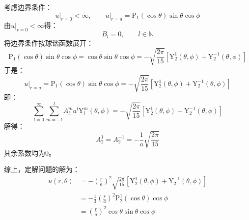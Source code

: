 \documentclass[fontset=windows]{ctexart}
\begin{document}
\begin{itemize}
\[    \]
    考虑边界条件：
    \[
    \left.u\right|_{r=0} < \infty,\qquad \left.u\right|_{r=a} = \mathrm{P}_1(\cos\theta)\sin\theta\cos\phi
    \]
    由$\left.u\right|_{r=0} < \infty$得：
    \[
    B_l = 0,\qquad l\in\mathbb{N}
    \]
    将边界条件按球谐函数展开：
    \[
    \mathrm{P}_1(\cos\theta)\sin\theta\cos\phi = \cos\theta\sin\theta\cos\phi = -\sqrt{\frac{2\pi}{15}}\left[\mathrm{Y}_2^1(\theta,\phi) + \mathrm{Y}_2^{-1}(\theta,\phi)\right]
    \]
    于是：
    \[
    \left.u\right|_{r=a} = \mathrm{P}_1(\cos\theta)\sin\theta\cos\phi = -\sqrt{\frac{2\pi}{15}}\left[\mathrm{Y}_2^1(\theta,\phi) + \mathrm{Y}_2^{-1}(\theta,\phi)\right]
    \]
    即：
    \[
    \sum_{l=0}^{\infty}\sum_{m=-l}^{l}A_l^m a^l \mathrm{Y}_l^m(\theta,\phi) = -\sqrt{\frac{2\pi}{15}}\left[\mathrm{Y}_2^1(\theta,\phi) + \mathrm{Y}_2^{-1}(\theta,\phi)\right]
    \]
    解得：
    \[
    A_2^1 = A_2^{-1} = -\frac{1}{a}\sqrt{\frac{2\pi}{15}}
    \]
    其余系数均为0。

    综上，定解问题的解为：
    \begin{align*}
        u(r,\theta)
        &= -\left(\frac{r}{a}\right)^2\sqrt{\frac{2\pi}{15}}\left[\mathrm{Y}_2^1(\theta,\phi) + \mathrm{Y}_2^{-1}(\theta,\phi)\right] \\
        &= -\frac{1}{3}\left(\frac{r}{a}\right)^2 \mathrm{P}_2^1(\cos\theta)\cos\phi \\
        &= \left(\frac{r}{a}\right)^2\cos\theta\sin\theta\cos\phi
    \end{align*}
    \bigskip


\end{itemize}
\end{document}

